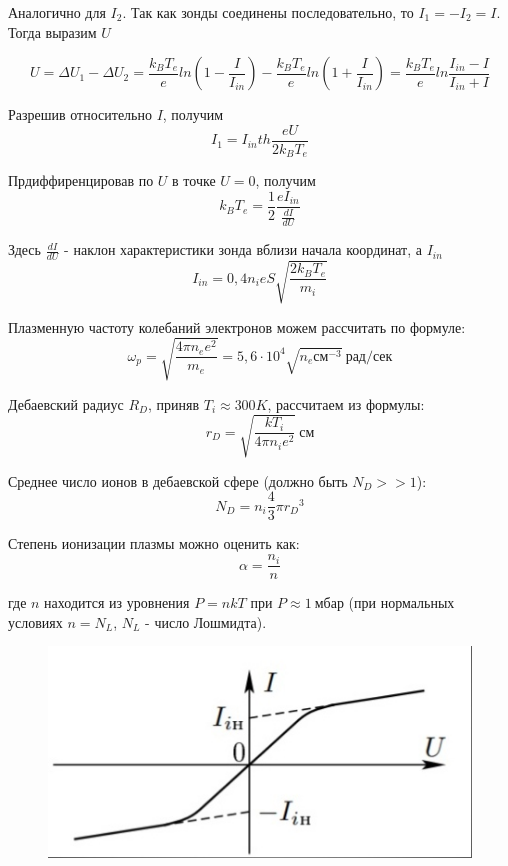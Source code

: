 Аналогично для $I_{2}$. Так как зонды соединены последовательно, то $I_{1} = -I_{2} = I$. Тогда выразим $U$ 

\[ U = \Delta U_{1} - \Delta U_{2} = \frac{k_{B} T_{e}}{e} ln{(1 - \frac{I}{I_{in}})} - \frac{k_{B} T_{e}}{e} ln{(1 + \frac{I}{I_{in}})}  = \frac{k_{B} T_{e}}{e} ln{\frac{I_{in} - I}{I_{in} + I}} \]

Разрешив относительно $I$, получим
\begin{equation}
   I_{1} = I_{in} th{\frac{e U}{2 k_{B} T_{e}}}
\end{equation}

Прдиффиренцировав по $U$ в точке $U = 0$, получим
\begin{equation}
   k_{B} T_{e} = \frac{1}{2} \frac{e I_{in}}{\frac{dI}{dU}}
\end{equation}

Здесь $\frac{dI}{dU}$ - наклон характеристики зонда вблизи начала координат, а  $ I_{in} $
\begin{equation}
I_{in} = 0,4 n_{i} e S \sqrt{\frac{2 k_{B} T_{e}}{m_{i}}}
\end{equation}

Плазменную частоту колебаний электронов можем рассчитать по формуле:
\begin{equation}
\omega_{p} = \sqrt{\frac{4 \pi n_{e} e^2}{m_{e}}} = 5,6 \cdot 10^4 \sqrt{n_{e} \text{см}^{-3}} \: \text{рад/сек}  
\end{equation}

Дебаевский радиус $R_{D}$, приняв $ T_{i} \approx  300 K $, рассчитаем из формулы:
\begin{equation}
r_{D} = \sqrt{\frac{k T_{i}}{4 \pi n_{i} e^2}} \: \text{см}
\end{equation}

Среднее число ионов в дебаевской сфере (должно быть $ N_{D} >> 1$):
\begin{equation}
N_{D} = n_{i} \frac{4}{3} \pi {r_{D}}^3
\end{equation}

Степень ионизации плазмы можно оценить как:
\begin{equation}
\alpha = \frac{n_{i}}{n}
\end{equation}

где $n$ находится из уровнения $P = n k T $ при $P \approx 1 \: \text{мбар}$ (при нормальных условиях $n= N_{L}$, $N_{L}$ - число Лошмидта).


\begin{figure}[h!]
\begin{center}
\includegraphics[width=0.7 \textwidth]{pics/zalupa_vodolaza.jpg}
\end{center}
\end{figure}


